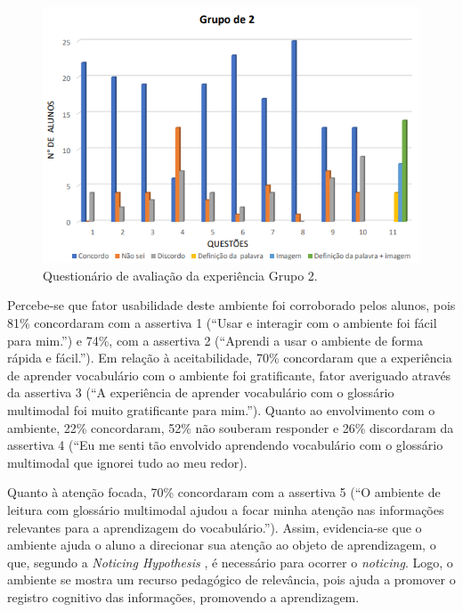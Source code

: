 \begin{figure}[htpb]
    \centering
    \begin{minipage}{.75\textwidth}
    \includegraphics[width=\textwidth]{graph-04.png}
    \caption{Questionário de avaliação da experiência Grupo 2.}
    \label{graph-04}
    \end{minipage}
\end{figure}

Percebe-se que fator usabilidade deste ambiente foi corroborado pelos
alunos, pois 81\% concordaram com a assertiva 1 (``Usar e interagir com
o ambiente foi fácil para mim.'') e 74\%, com a assertiva 2 (``Aprendi a
usar o ambiente de forma rápida e fácil.''). Em relação à
aceitabilidade, 70\% concordaram que a experiência de aprender
vocabulário com o ambiente foi gratificante, fator averiguado através da
assertiva 3 (``A experiência de aprender vocabulário com o glossário
multimodal foi muito gratificante para mim.''). Quanto ao envolvimento
com o ambiente, 22\% concordaram, 52\% não souberam responder e 26\%
discordaram da assertiva 4 (``Eu me senti tão envolvido aprendendo
vocabulário com o glossário multimodal que ignorei tudo ao meu redor).

Quanto à atenção focada, 70\% concordaram com a assertiva 5 (``O
ambiente de leitura com glossário multimodal ajudou a focar minha
atenção nas informações relevantes para a aprendizagem do
vocabulário.''). Assim, evidencia-se que o ambiente ajuda o aluno a
direcionar sua atenção ao objeto de aprendizagem, o que, segundo a
\emph{Noticing Hypothesis} \cite{schmidit1990}, é necessário para ocorrer o
\emph{noticing}. Logo, o ambiente se mostra um recurso pedagógico de
relevância, pois ajuda a promover o registro cognitivo das informações,
promovendo a aprendizagem.

